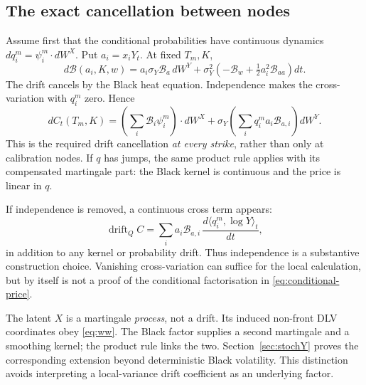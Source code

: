 \documentclass[11pt,a4paper]{article}
\numberwithin{equation}{section}
\theoremstyle{definition}\newtheorem{definition}[theorem]{Definition}
\theoremstyle{remark}\newtheorem{remark}[theorem]{Remark}
\newcommand{\Black}{\mathcal B}\newcommand{\LC}{\mathcal L}
\begin{document}
\subsection{The exact cancellation between nodes}
Assume first that the conditional probabilities have continuous dynamics $dq_i^m=\psi_i^m\cdot dW^X$. Put $a_i=x_iY_t$. At fixed $T_m,K$,
\[
 d\Black(a_i,K,w)
 =a_i\sigma_Y\Black_a\,dW^Y
 +\sigma_Y^2\left(-\Black_w+\tfrac12a_i^2\Black_{aa}\right)dt.
\]
The drift cancels by the Black heat equation. Independence makes the cross-variation with $q_i^m$ zero. Hence
\begin{equation}
 dC_t(T_m,K)
 =\left(\sum_i\Black_i\psi_i^m\right)\cdot dW^X
 +\sigma_Y\left(\sum_iq_i^ma_i\Black_{a,i}\right)dW^Y.
 \label{eq:call-vol}
\end{equation}
This is the required drift cancellation \emph{at every strike}, rather than only at calibration nodes. If $q$ has jumps, the same product rule applies with its compensated martingale part: the Black kernel is continuous and the price is linear in $q$.

If independence is removed, a continuous cross term appears:
\begin{equation}
 \operatorname{drift}_Q C
 =\sum_i a_i\Black_{a,i}\,
 \frac{d\langle q_i^m,\log Y\rangle_t}{dt},
 \label{eq:cross-term}
\end{equation}
in addition to any kernel or probability drift. Thus independence is a substantive construction choice. Vanishing cross-variation can suffice for the local calculation, but by itself is not a proof of the conditional factorisation in \eqref{eq:conditional-price}.

The latent $X$ is a martingale \emph{process}, not a drift. Its induced non-front DLV coordinates obey \eqref{eq:ww}. The Black factor supplies a second martingale and a smoothing kernel; the product rule links the two. Section~\ref{sec:stochY} proves the corresponding extension beyond deterministic Black volatility. This distinction avoids interpreting a local-variance drift coefficient as an underlying factor.
\end{document}
